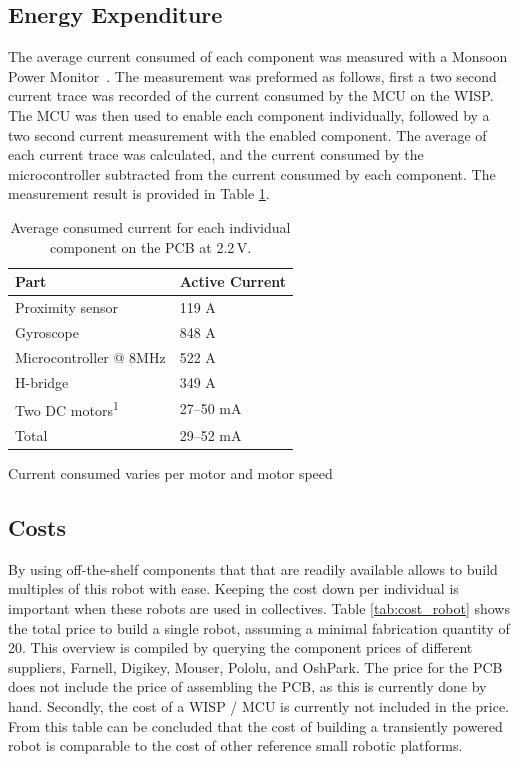 \subsection{Energy Expenditure}

The average current consumed of each component was measured with a Monsoon Power Monitor~\cite{monsoon_powermonitor_2017}.
The measurement was preformed as follows, first a two second current trace was recorded of the current consumed by the MCU on the WISP.
The MCU was then used to enable each component individually, followed by a two second current measurement with the enabled component.
The average of each current trace was calculated, and the current consumed by the microcontroller subtracted from the current consumed by each component.
The measurement result is provided in Table \ref{tab:avg_cur_comp}.


\begin{table}[t]
	\centering
	\begin{threeparttable}
		\caption{Average consumed current for each individual component on the PCB at 2.2\,V.}
		\label{tab:avg_cur_comp}
		\begin{tabular}{|l|l|} 
			\hline
			Part & Active Current \\
			\hline\hline
			Proximity sensor & 119 \textmu A \\
			Gyroscope & 848 \textmu A\\	
			Microcontroller @ 8MHz & 522 \textmu A\\
			H-bridge & 349 \textmu A \\
			Two DC motors\textsuperscript{1} & 27--50 mA  \\
			\hline \hline
			Total & 29--52 mA \\
			\hline
		\end{tabular}
		\begin{tablenotes}
		\small
		\item [1] Current consumed varies per motor and motor speed
		\end{tablenotes}
	\end{threeparttable}
\end{table}

\subsection{Costs}

By using off-the-shelf components that that are readily available allows to build multiples of this robot with ease.
Keeping the cost down per individual is important when these robots are used in collectives.
Table \ref{tab:cost_robot} shows the total price to build a single robot, assuming a minimal fabrication quantity of 20.
This overview is compiled by querying the component prices of different suppliers, Farnell, Digikey, Mouser, Pololu, and OshPark.
The price for the PCB does not include the price of assembling the PCB, as this is currently done by hand.
Secondly, the cost of a WISP / MCU is currently not included in the price.
From this table can be concluded that the cost of building a transiently powered robot is comparable to the cost of other reference small robotic platforms.


